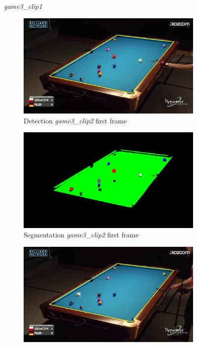 \begin{figure}[H]
	\caption{\textit{game3\_clip1}}
\end{figure}

\begin{figure}[H]
	\centering
	\begin{subfigure}[b]{0.48\textwidth}
		\centering
		\includegraphics[width=\textwidth]{images/Detection/game3_clip2_detected_balls_first_frame.jpg}
		\caption{Detection \textit{game3\_clip2} first frame}
		\label{fig: game3_clip2_first_frame_detected}
	\end{subfigure}
	\begin{subfigure}[b]{0.48\textwidth}
		\centering
		\includegraphics[width=\textwidth]{images/Segmentation/game3_clip2_segmented_balls_first_frame.jpg}
		\caption{Segmentation \textit{game3\_clip2} first frame}
		\label{fig: game3_clip2_first_frame_segmented}
	\end{subfigure}
	\begin{subfigure}[b]{0.48\textwidth}
		\centering
		\includegraphics[width=\textwidth]{images/Detection/game3_clip2_detected_balls_last_frame.jpg}

\end{subfigure}
\end{figure}
